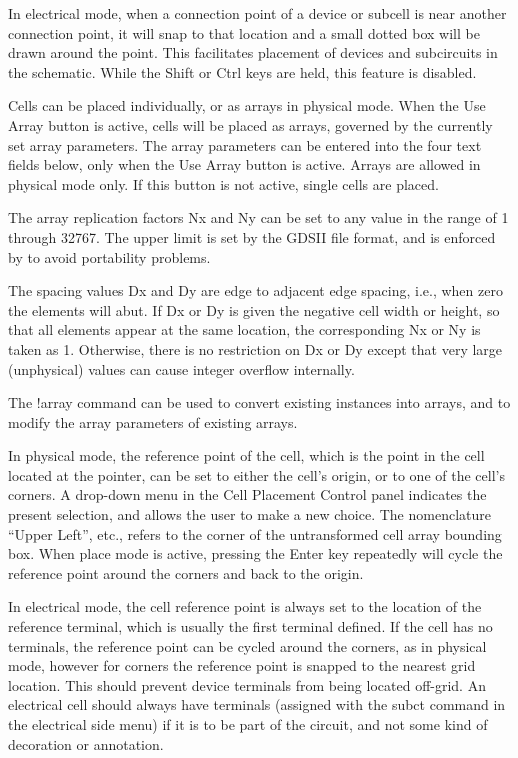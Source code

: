 In electrical mode, when a connection point of a device or subcell is
near another connection point, it will snap to that location and a
small dotted box will be drawn around the point.  This facilitates
placement of devices and subcircuits in the schematic.  While the {\kb
Shift} or {\kb Ctrl} keys are held, this feature is disabled.

Cells can be placed individually, or as arrays in physical mode.  When
the {\cb Use Array} button is active, cells will be placed as arrays,
governed by the currently set array parameters.  The array parameters
can be entered into the four text fields below, only when the {\cb Use
Array} button is active.  Arrays are allowed in physical mode only. 
If this button is not active, single cells are placed.

The array replication factors Nx and Ny can be set to any value in the
range of 1 through 32767.  The upper limit is set by the GDSII file
format, and is enforced by {\Xic} to avoid portability problems.

The spacing values Dx and Dy are edge to adjacent edge spacing, i.e.,
when zero the elements will abut.  If Dx or Dy is given the negative
cell width or height, so that all elements appear at the same
location, the corresponding Nx or Ny is taken as 1.  Otherwise, there
is no restriction on Dx or Dy except that very large (unphysical)
values can cause integer overflow internally.

The {\cb !array} command can be used to convert existing instances
into arrays, and to modify the array parameters of existing arrays.

In physical mode, the reference point of the cell, which is the point
in the cell located at the pointer, can be set to either the cell's
origin, or to one of the cell's corners.  A drop-down menu in the
{\cb Cell Placement Control} panel indicates the present selection,
and allows the user to make a new choice.  The nomenclature ``Upper
Left'', etc., refers to the corner of the untransformed cell array
bounding box.  When place mode is active, pressing the {\kb Enter} key
repeatedly will cycle the reference point around the corners and back
to the origin.

In electrical mode, the cell reference point is always set to the
location of the reference terminal, which is usually the first
terminal defined.  If the cell has no terminals, the reference point
can be cycled around the corners, as in physical mode, however for
corners the reference point is snapped to the nearest grid location. 
This should prevent device terminals from being located off-grid.  An
electrical cell should always have terminals (assigned with the {\cb
subct} command in the electrical side menu) if it is to be part of the
circuit, and not some kind of decoration or annotation.

